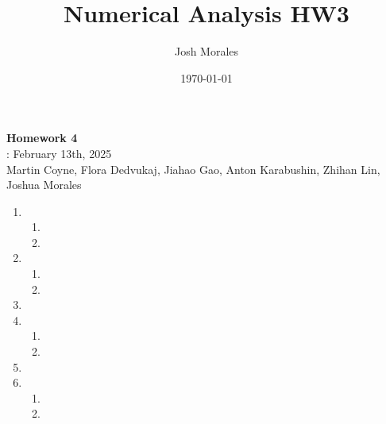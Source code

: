 \documentclass[12pt]{article}
\title{Numerical Analysis HW3}
\author{Josh Morales}
\date{\today}
\begin{document}
\pagestyle{fancy}
\begin{center}
\textbf{\Large Homework 4} \\
: February 13th, 2025\\
Martin Coyne, Flora Dedvukaj, Jiahao Gao, Anton Karabushin, Zhihan Lin, Joshua Morales
\end{center}
\begin{enumerate}[leftmargin=2em]
    \item
    \begin{enumerate}
        \item
        \item
    \end{enumerate}

    \item
    \begin{enumerate}
        \item
        \item
    \end{enumerate}

    \item

    \item
    \begin{enumerate}
        \item
        \item
    \end{enumerate}

    \item

    \item
    \begin{enumerate}
        \item
        \item
    \end{enumerate}
\end{enumerate}
\end{document}
